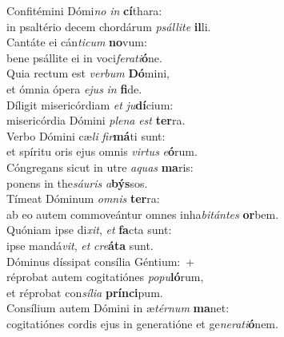 \evenverse Confitémini Dómi\textit{no} \textit{in} \textbf{cí}thara:~\*\\
\evenverse in psaltério decem chordárum \textit{psál}\textit{li}\textit{te} \textbf{il}li.\\
\oddverse Cantáte ei cán\textit{ti}\textit{cum} \textbf{no}vum:~\*\\
\oddverse bene psállite ei in voci\textit{fe}\textit{ra}\textit{ti}\textbf{ó}ne.\\
\evenverse Quia rectum est \textit{ver}\textit{bum} \textbf{Dó}mini,~\*\\
\evenverse et ómnia ópera \textit{e}\textit{jus} \textit{in} \textbf{fi}de.\\
\oddverse Díligit misericórdiam \textit{et} \textit{ju}\textbf{dí}cium:~\*\\
\oddverse misericórdia Dómini \textit{ple}\textit{na} \textit{est} \textbf{ter}ra.\\
\evenverse Verbo Dómini cæ\textit{li} \textit{fir}\textbf{má}ti sunt:~\*\\
\evenverse et spíritu oris ejus omnis \textit{vir}\textit{tus} \textit{e}\textbf{ó}rum.\\
\oddverse Cóngregans sicut in utre \textit{a}\textit{quas} \textbf{ma}ris:~\*\\
\oddverse ponens in the\textit{sáu}\textit{ris} \textit{a}\textbf{býs}sos.\\
\evenverse Tímeat Dóminum \textit{om}\textit{nis} \textbf{ter}ra:~\*\\
\evenverse ab eo autem commoveántur omnes inha\textit{bi}\textit{tán}\textit{tes} \textbf{or}bem.\\
\oddverse Quóniam ipse di\textit{xit}, \textit{et} \textbf{fa}cta sunt:~\*\\
\oddverse ipse mandá\textit{vit}, \textit{et} \textit{cre}\textbf{á}\textbf{ta} sunt.\\
\evenverse Dóminus díssipat consília Géntium:~+\\
\evenverse  réprobat autem cogitatiónes \textit{po}\textit{pu}\textbf{ló}rum,~\*\\
\evenverse et réprobat con\textit{sí}\textit{li}\textit{a} \textbf{prín}\textbf{ci}pum.\\
\oddverse Consílium autem Dómini in æ\textit{tér}\textit{num} \textbf{ma}net:~\*\\
\oddverse cogitatiónes cordis ejus in generatióne et ge\textit{ne}\textit{ra}\textit{ti}\textbf{ó}nem.\\
